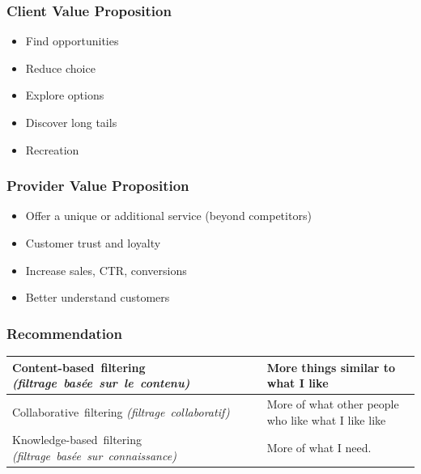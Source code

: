 \begin{frame}
  \frametitle{Client Value Proposition}
  \begin{itemize}
  \item Find opportunities
  \item Reduce choice
  \item Explore options
  \item Discover long tails
  \item Recreation
  \end{itemize}
\end{frame}

\begin{frame}
  \frametitle{Provider Value Proposition}

  \begin{itemize}
  \item Offer a unique or additional service (beyond competitors)
  \item Customer trust and loyalty
  \item Increase sales, CTR, conversions
  \item Better understand customers
  \end{itemize}
\end{frame}


\begin{frame}
  \frametitle{Recommendation}

  \begin{tabular}{|p{5.7cm}|p{4cm}|}
    \hline
    \topstrut\hbox{Content-based filtering}
    \hbox{\it (filtrage basée sur le contenu)}
    &
    More things similar to what I like\bottomstrut
    \\
    \hline
    \topstrut\hbox{Collaborative filtering}
    \hbox{\it (filtrage collaboratif)}
    &
    More of what other people who like what I like like
    \bottomstrut
    \\
    \hline
    \topstrut\hbox{Knowledge-based filtering}
    \hbox{\it (filtrage basée sur connaissance)}\bottomstrut
    &
    More of what I need.\bottomstrut
    \\
    \hline
  \end{tabular}
\end{frame}

